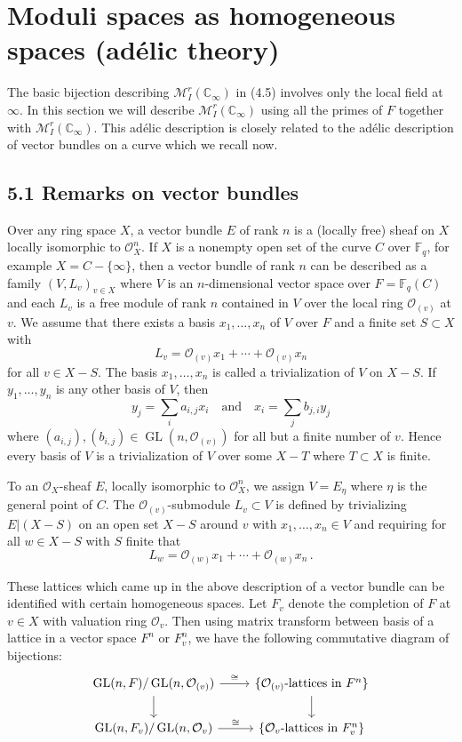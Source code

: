 \documentclass[12pt,a4paper]{article}
\theoremstyle{plain}
\theoremstyle{definition}
\theoremstyle{remark}
\DeclareMathOperator{\GL}{GL}
\begin{document}
\section{Moduli spaces as homogeneous spaces (ad\'elic theory)}

The basic bijection describing $\mathcal{M}_I^r(\mathbb{C}_\infty)$ in (4.5) 
involves only the local field at $\infty$. In this section we will describe 
$\mathcal{M}_I^r(\mathbb{C}_\infty)$ using all the primes of $F$ together with 
$\mathcal{M}_I^r(\mathbb{C}_\infty)$. This ad\'elic description is closely 
related to the ad\'elic description of vector bundles on a curve which we 
recall now.

\subsection*{5.1 Remarks on vector bundles}

Over any ring space $X$, a vector bundle $E$ of rank $n$ is a (locally free) 
sheaf on $X$ locally isomorphic to $\mathcal{O}_X^n$. If $X$ is a nonempty open 
set of the curve $C$ over $\mathbb{F}_q$, for example $X = C - \{\infty\}$, 
then a vector bundle of rank $n$ can be described as a family $(V, L_v)_{v \in X}$ 
where $V$ is an $n$-dimensional vector space over $F = \mathbb{F}_q(C)$ and each 
$L_v$ is a free module of rank $n$ contained in $V$ over the local ring 
$\mathcal{O}_{(v)}$ at $v$. We assume that there exists a basis 
$x_1, \ldots, x_n$ of $V$ over $F$ and a finite set $S \subset X$ with
\[
L_v = \mathcal{O}_{(v)}x_1 + \cdots + \mathcal{O}_{(v)}x_n
\]
for all $v \in X - S$. The basis $x_1, \ldots, x_n$ is called a trivialization 
of $V$ on $X - S$. If $y_1, \ldots, y_n$ is any other basis of $V$, then
\[
y_j = \sum_i a_{i,j} x_i \quad\text{and}\quad x_i = \sum_j b_{j,i} y_j
\]
where $(a_{i,j}), (b_{i,j}) \in \GL(n, \mathcal{O}_{(v)})$ for all but a finite 
number of $v$. Hence every basis of $V$ is a trivialization of $V$ over some 
$X - T$ where $T \subset X$ is finite.

To an $\mathcal{O}_X$-sheaf $E$, locally isomorphic to $\mathcal{O}_X^n$, we assign 
$V = E_\eta$ where $\eta$ is the general point of $C$. The 
$\mathcal{O}_{(v)}$-submodule $L_v \subset V$ is defined by trivializing 
$E|(X-S)$ on an open set $X-S$ around $v$ with $x_1, \ldots, x_n \in V$ and 
requiring for all $w \in X - S$ with $S$ finite that
\[
L_w = \mathcal{O}_{(w)}x_1 + \cdots + \mathcal{O}_{(w)}x_n \,.
\]

These lattices which came up in the above description of a vector bundle can 
be identified with certain homogeneous spaces. Let $F_v$ denote the completion 
of $F$ at $v \in X$ with valuation ring $\mathcal{O}_v$. Then using matrix 
transform between basis of a lattice in a vector space $F^n$ or $F_v^n$, we 
have the following commutative diagram of bijections:
\[
\begin{tikzcd}
\GL(n,F)/\GL(n,\mathcal{O}_{(v)}) \arrow[r, "\cong"] \arrow[d] & \{\mathcal{O}_{(v)}\text{-lattices in }F^n\} \arrow[d] \\
\GL(n,F_v)/\GL(n,\mathcal{O}_v) \arrow[r, "\cong"] & \{\mathcal{O}_v\text{-lattices in }F_v^n\}
\end{tikzcd}
\]
\end{document}
